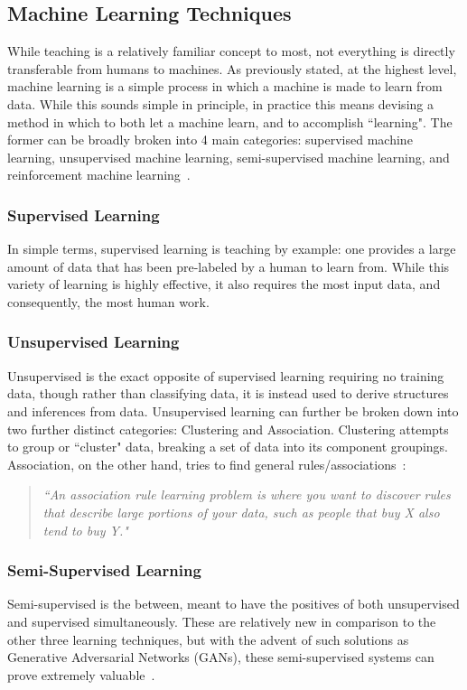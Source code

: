 \documentclass[12pt,letterpaper,oneside,reqno]{book}
\theoremstyle{plain}
\theoremstyle{definition}
\theoremstyle{plain}
\theoremstyle{remark}
\theoremstyle{plain}
\theoremstyle{definition}
\theoremstyle{plain}
\begin{document}
\subsection{Machine Learning Techniques}
While teaching is a relatively familiar concept to most, not everything is directly transferable from humans to machines. As previously stated, at the highest level, machine learning is a simple process in which a machine is made to learn from data. While this sounds simple in principle, in practice this means devising a method in which to both let a machine learn, and to accomplish ``learning". The former can be broadly broken into 4 main categories: supervised machine learning, unsupervised machine learning, semi-supervised machine learning, and reinforcement machine learning~\cite{ExpertAI20}.
\subsubsection{Supervised Learning}
In simple terms, supervised learning is teaching by example: one provides a large amount of data that has been pre-labeled by a human to learn from. While this variety of learning is highly effective, it also requires the most input data, and consequently, the most human work.
\subsubsection{Unsupervised Learning}
Unsupervised is the exact opposite of supervised learning requiring no training data, though rather than classifying data, it is instead used to derive structures and inferences from data. Unsupervised learning can further be broken down into two further distinct categories: Clustering and Association. Clustering attempts to group or ``cluster" data, breaking a set of data into its component groupings. Association, on the other hand, tries to find general rules/associations~\cite{Brownlee16}:
\begin{quote}
    \itshape``An association rule learning problem is where you want to discover rules that describe large portions of your data, such as people that buy X also tend to buy Y." 
\end{quote} 
\subsubsection{Semi-Supervised Learning} %
Semi-supervised is the between, meant to have the positives of both unsupervised and supervised simultaneously. These are relatively new in comparison to the other three learning techniques, but with the advent of such solutions as Generative Adversarial Networks (GANs), these semi-supervised systems can prove extremely valuable~\cite{Heath20}.
\end{document}
